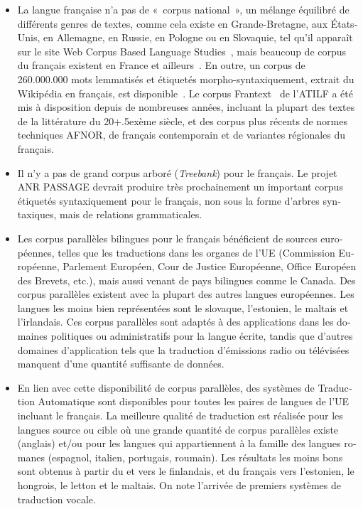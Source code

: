 \begin{french}
\begin{multicols}{2}
\begin{itemize}
\item La langue française n'a pas de «~corpus national~», un mélange équilibré
de différents genres de textes, comme cela existe en Grande-Bretagne,
aux États-Unis, en Allemagne, en Russie, en Pologne ou en Slovaquie,
tel qu'il apparaît sur le site Web Corpus Based Language Studies~\cite{corpuslangstud},
mais beaucoup de corpus du français existent en France et
ailleurs~\cite{corpusfr}. En outre, un corpus de 260.000.000 mots lemmatisés et
étiquetés morpho-syntaxiquement, extrait du Wikipédia en français, est
disponible~\cite{wikipediafr}. Le corpus Frantext~\cite{atilf} de l'ATILF a été mis à disposition
depuis de nombreuses années, incluant la plupart des textes de la
littérature du 20\raise+.5ex\hbox{ème} siècle, et des corpus plus récents de normes
techniques AFNOR, de français contemporain et de variantes régionales
du français.

\item Il n'y a pas de grand corpus arboré ({\em Treebank}) pour le français. Le projet ANR PASSAGE
devrait produire très prochainement un important corpus étiquetés
syntaxiquement pour le français, non sous la forme d'arbres
syntaxiques, mais de relations grammaticales.

\item Les corpus parallèles bilingues pour le français bénéficient de
sources européennes, telles que les traductions dans les organes de
l'UE (Commission Européenne, Parlement Européen, Cour de Justice
Européenne, Office Européen des Brevets, etc.), mais aussi venant de
pays bilingues comme le Canada. Des corpus parallèles existent avec la
plupart des autres langues européennes. Les langues les moins bien représentées
sont le slovaque, l'estonien, le maltais et l'irlandais. Ces
corpus parallèles sont adaptés à des applications dans les domaines
politiques ou administratifs pour la langue écrite, tandis que
d'autres domaines d'application tels que la traduction d'émissions
radio ou télévisées manquent d'une quantité suffisante de données.

\item En lien avec cette disponibilité de corpus parallèles, des systèmes de
Traduction Automatique sont disponibles pour toutes les paires de
langues de l'UE incluant le français. La meilleure qualité de
traduction est réalisée pour les langues source ou cible où une grande
quantité de corpus parallèles existe (anglais) et/ou pour les langues
qui appartiennent à la famille des langues romanes (espagnol, italien,
portugais, roumain). Les résultats les moins bons sont obtenus à partir du et
vers le finlandais, et du français vers l'estonien, le hongrois, le
letton et le maltais. On note l'arrivée de premiers systèmes de traduction vocale.


\end{itemize}
\end{multicols}
\end{french}
